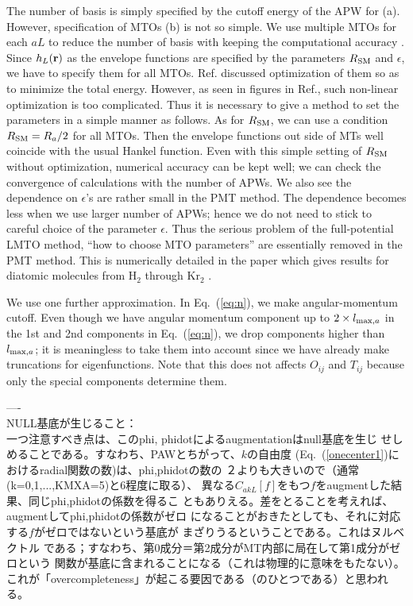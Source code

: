 \documentclass[twocolumn,showpacs,preprintnumbers,amsmath,amssymb,floatfix]{revtex4-1}
\newcommand{\bfr}{{\bf r}}
\newcommand{\req}[1]{\mbox{Eq.~\!(\ref{#1})}}
\def\RSM{R_{\rm SM}}
\def\CakL{C_{akL}}
\begin{document}
The number of basis is simply specified by the cutoff energy of the APW
for (a). However, specification of MTOs (b) is not so simple.  
We use multiple MTOs for each $aL$ to reduce the number of basis with 
keeping the computational accuracy \cite{pmt1}.
Since $h_L(\bfr)$ as the envelope functions are specified 
by the parameters $\RSM$ and $\epsilon$, we have to specify them for
all MTOs. Ref.\cite{lmfchap} discussed optimization of them so as
to minimize the total energy. However, as seen in figures in
Ref.\cite{lmfchap}, such non-linear optimization is too complicated.
Thus it is necessary to give a method to set the parameters 
in a simple manner as follows. 
As for $\RSM$, we can use a condition $\RSM= R_a/2$ for all MTOs. 
Then the envelope functions out side of MTs well coincide with
the usual Hankel function. 
Even with this simple setting of $\RSM$ without optimization,
numerical accuracy can be kept well; we can check the
convergence of calculations with the number of APWs.
We also see the dependence on $\epsilon$'s are rather small
in the PMT method. The dependence becomes less when we use larger
number of APWs; hence we do not need to stick to careful choice of
the parameter $\epsilon$.
Thus the serious problem of the full-potential LMTO method, ``how
to choose MTO parameters'' are essentially removed in the PMT
method. This is numerically detailed in the paper which gives results for
diatomic molecules from H$_2$ through Kr$_2$ \cite{kotani_linearized_2013}.

We use one further approximation. In \req{eq:n}, we make angular-momentum cutoff.
Even though we have angular momentum component up to 
$2\times l_{{\rm max},a}$ in the 1st and 2nd components in \req{eq:n}, 
we drop components higher than $l_{{\rm max},a}$; 
it is meaningless to take them into account since we have already make 
truncations for eigenfunctions. Note that this does not affects $O_{ij}$
and $T_{ij}$ because only the special components determine them.

----\\
NULL基底が生じること：\\
一つ注意すべき点は、このphi, phidotによるaugmentationはnull基底を生じ
せしめることである。すなわち、PAWとちがって、$k$の自由度
(\req{onecenter1}におけるradial関数の数)は、phi,phidotの数の
２よりも大きいので（通常(k=0,1,...,KMXA=5)と6程度に取る）、
異なる$\CakL[f]$をもつ$f$をaugmentした結果、同じphi,phidotの係数を得るこ
ともありえる。差をとることを考えれば、augmentしてphi,phidotの係数がゼロ
になることがおきたとしても、それに対応する$f$がゼロではないという基底が
まざりうるということである。これはヌルベクトル
である；すなわち、第0成分＝第2成分がMT内部に局在して第1成分がゼロという
関数が基底に含まれることになる（これは物理的に意味をもたない）。
これが「overcompleteness」が起こる要因である（のひとつである）と思われる。\\
\end{document}

